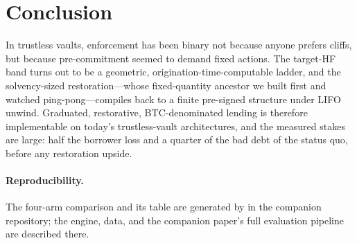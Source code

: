 \documentclass[12pt]{article}
\begin{document}
\section{Conclusion}
In trustless vaults, enforcement has been binary not because anyone prefers
cliffs, but because pre-commitment seemed to demand fixed actions. The
target-HF band turns out to be a geometric, origination-time-computable
ladder, and the solvency-sized restoration---whose fixed-quantity ancestor we
built first and watched ping-pong---compiles back to a finite pre-signed
structure under LIFO unwind. Graduated, restorative, BTC-denominated lending
is therefore implementable on today's trustless-vault architectures, and the
measured stakes are large: half the borrower loss and a quarter of the bad
debt of the status quo, before any restoration upside.

\paragraph{Reproducibility.} The four-arm comparison and its table are
generated by  in the companion
repository; the engine, data, and the companion paper's full evaluation
pipeline are described there.



\end{document}
